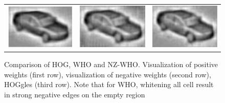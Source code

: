 \documentclass[10pt,twocolumn,letterpaper]{article}
\begin{document}
\begin{figure}[t]
\begin{center}
\begin{tabular}{ccc}
     \includegraphics[width=0.28\linewidth]{ihog_hog200_crop.png} &
     \includegraphics[width=0.28\linewidth]{ihog_whiten_all200_crop.png} &
     \includegraphics[width=0.28\linewidth]{ihog_whiten_non_zero200_crop.png} \\
 \end{tabular}
  \end{center}
  \caption{Comparison of HOG, WHO and NZ-WHO. Visualization of positive weights (first row),  visualization of negative weights (second row), HOGgles \cite{vondrick2013} (third row). Note that for WHO, whitening all cell result in strong negative edges on the empty region}
  \label{fig:whocomparison}
\end{figure}

\end{document}
